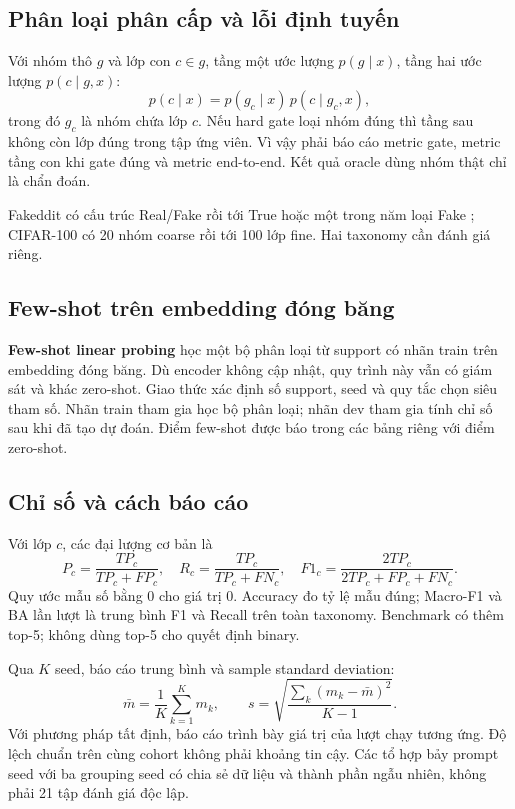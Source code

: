 \documentclass[12pt,a4paper]{article}
\numberwithin{figure}{section}
\numberwithin{table}{section}
\numberwithin{equation}{section}
\begin{document}
\subsection{Phân loại phân cấp và lỗi định tuyến}

Với nhóm thô $g$ và lớp con $c\in g$, tầng một ước lượng $p(g\mid x)$, tầng hai ước lượng
$p(c\mid g,x)$:
\begin{equation}
p(c\mid x)=p(g_c\mid x)\,p(c\mid g_c,x),
\end{equation}
trong đó $g_c$ là nhóm chứa lớp $c$. Nếu hard gate loại nhóm đúng thì tầng sau không còn lớp đúng
trong tập ứng viên. Vì vậy phải báo cáo metric gate, metric tầng con khi gate đúng và metric
end-to-end. Kết quả oracle dùng nhóm thật chỉ là chẩn đoán.

Fakeddit có cấu trúc Real/Fake rồi tới True hoặc một trong năm loại Fake \cite{fakeddit}; CIFAR-100
có 20 nhóm coarse rồi tới 100 lớp fine. Hai taxonomy cần đánh giá riêng.

\subsection{Few-shot trên embedding đóng băng}

\textbf{Few-shot linear probing} học một bộ phân loại từ support có nhãn train trên embedding đóng băng. Dù encoder không cập nhật, quy trình này vẫn có giám sát và khác zero-shot. Giao thức xác định số support, seed và quy tắc chọn siêu tham số. Nhãn train tham gia học bộ phân loại; nhãn dev tham gia tính chỉ số sau khi đã tạo dự đoán. Điểm few-shot được báo trong các bảng riêng với điểm zero-shot.

\subsection{Chỉ số và cách báo cáo}

Với lớp $c$, các đại lượng cơ bản là
\begin{equation}
P_c=\frac{TP_c}{TP_c+FP_c},\quad R_c=\frac{TP_c}{TP_c+FN_c},\quad
F1_c=\frac{2TP_c}{2TP_c+FP_c+FN_c}.
\end{equation}
Quy ước mẫu số bằng 0 cho giá trị 0. Accuracy đo tỷ lệ mẫu đúng; Macro-F1 và BA lần lượt là trung
bình F1 và Recall trên toàn taxonomy. Benchmark có thêm top-5; không dùng top-5 cho quyết định
binary.

Qua $K$ seed, báo cáo trung bình và sample standard deviation:
\begin{equation}
\bar m=\frac1K\sum_{k=1}^K m_k,\qquad s=\sqrt{\frac{\sum_k(m_k-\bar m)^2}{K-1}}.
\end{equation}
Với phương pháp tất định, báo cáo trình bày giá trị của lượt chạy tương ứng. Độ lệch chuẩn trên cùng cohort không phải
khoảng tin cậy. Các tổ hợp bảy prompt seed với ba grouping seed có chia sẻ dữ liệu và thành phần
ngẫu nhiên, không phải 21 tập đánh giá độc lập.
\newpage
\end{document}

